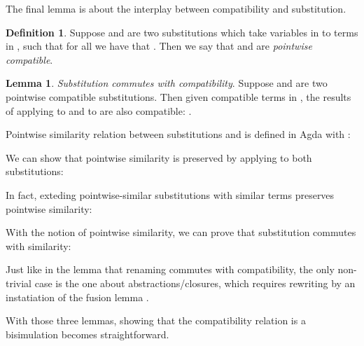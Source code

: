 \documentclass[bsc,frontabs,oneside,singlespacing,parskip,deptreport]{infthesis}
\theoremstyle{definition}
\newtheorem*{definition}{Definition}
\theoremstyle{lemma}
\newtheorem*{lemma}{Lemma}
\begin{document}

The final lemma is about the interplay between compatibility and
substitution. 

\begin{definition}
  Suppose  and  are two substitutions which take
  variables  in  to terms in , such that for all
   we have that . Then we say
  that  and  are \textit{pointwise compatible}.
\end{definition}

\begin{lemma}
  \textit{Substitution commutes with compatibility}. Suppose 
  and  are two pointwise compatible substitutions. Then given
  compatible terms  in , the results of applying
   to  and  to  are also compatible:
  .
\end{lemma}

Pointwise similarity relation between substitutions  and 
is defined in Agda with :


We can show that pointwise similarity is preserved by
applying  to both substitutions:


In fact, exteding pointwise-similar substitutions with similar terms 
preserves pointwise similarity:


With the notion of pointwise similarity, we can prove that
substitution commutes with similarity:


Just like in the lemma that renaming commutes with compatibility, the
only non-trivial case is the one about abstractions/closures, which
requires rewriting by an instatiation of the fusion lemma
.


With those three lemmas, showing that the compatibility relation is a
bisimulation becomes straightforward.
\end{document}
